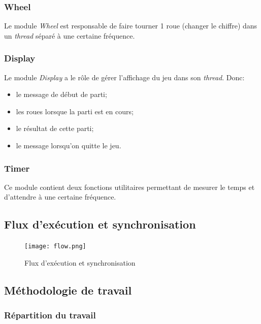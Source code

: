 \documentclass[11pt, a4paper]{article}
\begin{document}
\subsubsection{Wheel}
Le module \textit{Wheel} est responsable de faire tourner 1 roue (changer le chiffre) dans un \textit{thread} séparé à une certaine fréquence.

\subsubsection{Display}
Le module \textit{Display} a le rôle de gérer l'affichage du jeu dans son \textit{thread}. Donc:
\begin{itemize}
    \item le message de début de parti;
    \item les roues lorsque la parti est en cours;
    \item le résultat de cette parti;
    \item le message lorsqu'on quitte le jeu.
\end{itemize}

\subsubsection{Timer}
Ce module contient deux fonctions utilitaires permettant de mesurer le temps et
d'attendre à une certaine fréquence.

\newpage

\subsection{Flux d'exécution et synchronisation}

\begin{figure}[H]
    \begin{center}
        \texttt{[image: flow.png]}
    \end{center}
    \caption{Flux d'exécution et synchronisation}
    \label{Flux d'exécution et synchronisation}
\end{figure}

\newpage

\subsection{Méthodologie de travail}
\subsubsection{Répartition du travail}
\end{document}
